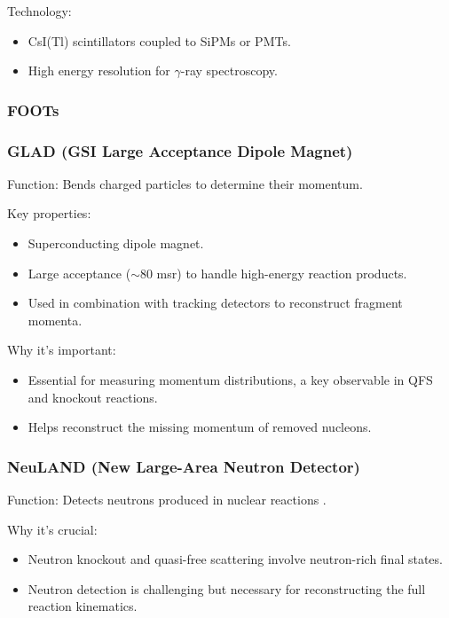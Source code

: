 Technology:

\begin{itemize}
	\item CsI(Tl) scintillators coupled to SiPMs or PMTs.
	\item High energy resolution for $\gamma$-ray spectroscopy.
\end{itemize}


\subsubsection{FOOTs}

\subsubsection{GLAD (GSI Large Acceptance Dipole Magnet)}

Function: Bends charged particles to determine their momentum.

Key properties:

\begin{itemize}
	\item Superconducting dipole magnet.
	\item Large acceptance ($\sim$80 msr) to handle high-energy reaction products.
	\item Used in combination with tracking detectors to reconstruct fragment momenta.
\end{itemize}

Why it’s important:

\begin{itemize}
	\item Essential for measuring momentum distributions, a key observable in \gls{QFS} and knockout reactions.
	\item Helps reconstruct the missing momentum of removed nucleons.
\end{itemize}


\subsubsection{NeuLAND (New Large-Area Neutron Detector)}

Function: Detects neutrons produced in nuclear reactions \cite{boretzky_neuland_2021}.

Why it's crucial:

\begin{itemize}
	\item Neutron knockout and quasi-free scattering involve neutron-rich final states.
	\item Neutron detection is challenging but necessary for reconstructing the full reaction kinematics.
\end{itemize}


